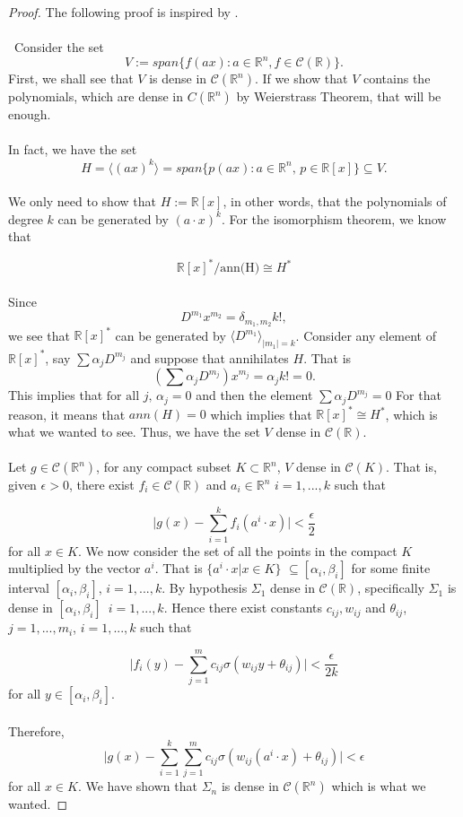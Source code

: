 \documentclass[../main.tex]{subfiles}
\begin{document}
	\begin{proof} %
			The following proof is inspired by \cite{chui_approximation}.\\ \\ Consider the set $$V:= span\{ f(ax) : a \in \mathbb{R}^n, f \in \mathcal{C}(\mathbb{R}) \}.$$ First, we shall see that $V$ is dense in $\mathcal{C}(\mathbb{R}^n)$.  If we show that $V$ contains the polynomials, which are dense in $C(\mathbb{R}^n)$ by Weierstrass Theorem, that will be enough. \\ \\
			\noindent In fact, we have the set $$ H = \langle (a x)^k\rangle = span\{ p(ax) : a \in \mathbb{R}^n, \, p \in \mathbb{R}[x] \} \subseteq V.$$ \\
			We only need to show that $H:=\mathbb{R}[x]$, in other words, that the polynomials of degree $k$ can be generated by $(a\cdot x)^k$. For the isomorphism theorem, we know that
			
			 $$\mathbb{R}[x]^*/\text{ann(H)}\cong H^*$$
			 \\ 
			 Since $$D^{m_1} x^{m_2}= \delta_{m_1,m_2}k!, $$ we see that $\mathbb{R}[x]^*$ can be generated by $\langle D^{m_1}\rangle _{|m_1|=k}$. Consider any element of $\mathbb{R}[x]^*$, say $\sum \alpha_j D^{m_j}$ and suppose that annihilates  $H$. That is $$(\sum \alpha_j D^{m_j} ) x^{m_j}=\alpha_j k! = 0.$$ \noindent This implies that $\text{for all } j,\, \alpha_j =0$ and then the element $\sum \alpha_j D^{m_j}=0$
			 For that reason, it means that $ann(H)=0$ which implies that $\mathbb{R}[x]^*\cong H^*$, which is what we wanted to see. Thus, we have the set $V$ dense in $\mathcal{C}(\mathbb{R})$.
			\\ \\ 
			\noindent Let $g\in \mathcal{C}(\mathbb{R}^n) $, for any compact subset $K \subset \mathbb{R}^n  $, $V$ dense in $\mathcal{C}(K)$. That is, given $\epsilon >0$, there exist $f_i\in  \mathcal{C}(\mathbb{R})$ and $a_i \in \mathbb{R}^n $    {\scriptsize $i=1,...,k$}  such that
			
			$$ \big| g(x)-\sum_{i=1}^k f_i(a^i \cdot x) \big| < \frac{\epsilon}{2}$$
			for all $x\in K$. We now consider the set of all the points in the compact $K$ multiplied by the vector $a^i$. That is $\{a^i \cdot x | x \in K\}$ $\subseteq[\alpha_i,\beta_i] $ for some finite interval $[\alpha_i,\beta_i]$, $i=1,...,k$. By hypothesis $\Sigma_1 $ dense in $\mathcal{C}(\mathbb{R})$, specifically $\Sigma_1 $ is dense in $[\alpha_i,\beta_i ]$ $ \, i=1,...,k$. Hence there exist constants $c_{ij}, w_{ij}$ and $\theta_{ij}$, $j=1,...,m_i$, $i=1,...,k$ such that 
			
			$$ \big|f_i(y) - \sum_{j=1}^{m} c_{ij} \sigma(w_{ij}y+ \theta_{ij})\big| < \frac{\epsilon}{2k}$$
			for all $y\in [\alpha_i,\beta_i ]$. \\ \\
			Therefore, 
			$$ \big| g(x) - \sum_{i=1}^k \sum_{j=1}^m c_{ij} \sigma(w_{ij}(a^i \cdot x) + \theta_{ij})  \big| < \epsilon$$
			for all $x\in K$. We have shown that  $\Sigma_n$ is dense in $\mathcal{C}(\mathbb{R}^n)$ which is what we wanted.
		\end{proof}
\end{document}
